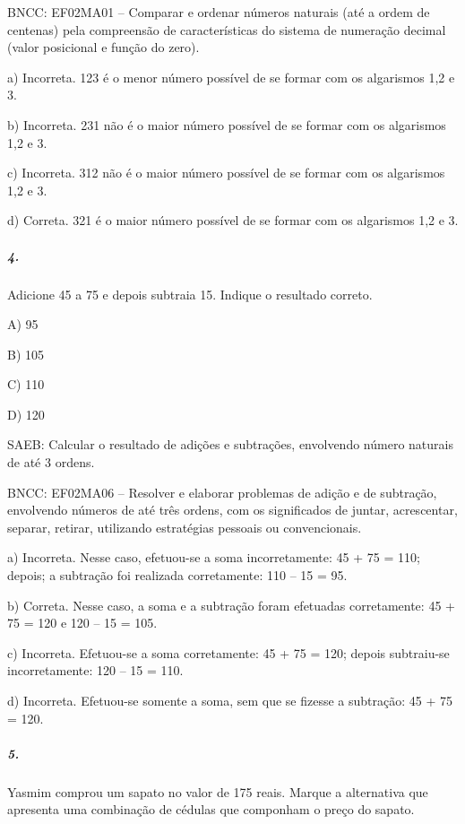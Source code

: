 BNCC: EF02MA01 -- Comparar e ordenar números naturais (até a ordem de
centenas) pela compreensão de características do sistema de numeração
decimal (valor posicional e função do zero).

a) Incorreta. 123 é o menor número possível de se formar com os algarismos 1,2 e 3.

b) Incorreta. 231 não é o maior número possível de se formar com os algarismos 1,2 e 3.

c) Incorreta. 312 não é o maior número possível de se  formar com os algarismos 1,2 e 3.

d) Correta. 321 é o maior número possível de se formar com os algarismos 1,2 e 3.

\subparagraph{4. }\label{section-103}

Adicione 45 a 75 e depois subtraia 15. Indique o resultado correto.

A) 95

B) 105

C) 110

D) 120

SAEB: Calcular o resultado de adições e subtrações, envolvendo
número naturais de até 3 ordens.

BNCC: EF02MA06 -- Resolver e elaborar problemas de adição e de subtração,
envolvendo números de até três ordens, com os significados de juntar,
acrescentar, separar, retirar, utilizando estratégias pessoais ou
convencionais.

a) Incorreta. Nesse caso, efetuou-se a soma incorretamente: 45 + 75 = 110; depois; a subtração foi realizada corretamente: 110 -- 15 = 95.

b) Correta. Nesse caso, a soma e a subtração foram efetuadas corretamente: 45 + 75 = 120 e 120 -- 15 = 105.

c) Incorreta. Efetuou-se a soma corretamente: 45 + 75 = 120; depois
subtraiu-se incorretamente: 120 -- 15 = 110.

d) Incorreta. Efetuou-se somente a soma, sem que se fizesse a subtração: 45 + 75 = 120.

\subparagraph{5. }\label{section-104}

Yasmim comprou um sapato no valor de 175 reais. Marque a alternativa que apresenta uma combinação de cédulas que componham o preço do sapato.

